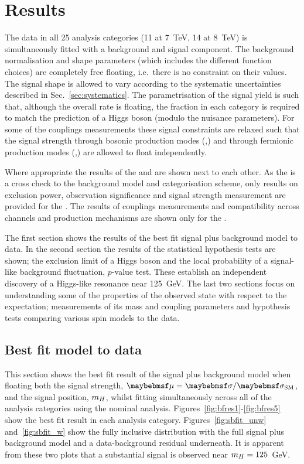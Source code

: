 \chapter{Results}
\label{chap:results}

The data in all 25 analysis categories (11 at 7~TeV, 14 at 8~TeV) is simultaneously fitted with a background and signal component. The background normalisation and shape parameters (which includes the different function choices) are completely free floating, i.e.~there is no constraint on their values. The signal shape is allowed to vary according to the systematic uncertainties described in Sec.~\ref{sec:systematics}. The parametrisation of the signal yield is such that, although the overall rate is floating, the fraction in each category is required to match the prediction of a \SM Higgs boson (modulo the nuisance parameters). For some of the couplings measurements these signal constraints are relaxed such that the signal strength through bosonic production modes (\VBF,\VH) and through fermionic production modes (\ggH,\ttH) are allowed to float independently. 

Where appropriate the results of the \MFM and \SMVA are shown next to each other. As the \SMVA is a cross check to the background model and categorisation scheme, only results on exclusion power, observation significance and signal strength measurement are provided for the \SMVA. The results of couplings measurements and compatibility across channels and production mechanisms are shown only for the \MFM.

The first section shows the results of the best fit signal plus background model to data. In the second section the results of the statistical hypothesis tests are shown; the exclusion limit of a \SM Higgs boson and the local probability of a signal-like background fluctuation, $p$-value test. These establish an independent discovery of a Higgs-like resonance near 125~GeV. The last two sections focus on understanding some of the properties of the observed state with respect to the \SM expectation; measurements of its mass and coupling parameters and hypothesis tests comparing various spin models to the data.

\section{Best fit model to data}

This section shows the best fit result of the signal plus background model when floating both the signal strength, $\mu=\musm$, and the signal position, $m_{H}$, whilst fitting simultaneously across all of the analysis categories using the nominal \MFM analysis. Figures~\ref{fig:bfres1}-\ref{fig:bfres5} show the best fit result in each analysis category. Figures~\ref{fig:sbfit_unw} and~\ref{fig:sbfit_w} show the fully inclusive distribution with the full signal plus background model and a data-background residual underneath. It is apparent from these two plots that a substantial signal is observed near $m_{H}=125$~GeV.

